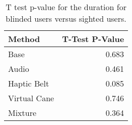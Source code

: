 
\begin{table}[!htb]
\centering
\caption{T test p-value for the duration for blinded users versus sighted users.}
\label{tab:ttest_duration}
\begin{tabular}{lr}
\toprule
      Method &  T-Test P-Value \\
\midrule
        Base &           0.683 \\
       Audio &           0.461 \\
 Haptic Belt &           0.085 \\
Virtual Cane &           0.746 \\
     Mixture &           0.364 \\
\bottomrule
\end{tabular}
\end{table}

